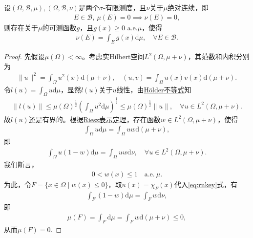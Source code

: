 \documentclass[../../main.tex]{subfiles}%
\begin{document}
\begin{theorem}\label{theorem:泛函分析--Radon-Nikodym定理}
设$(\Omega,\mathcal{B},\mu),(\Omega,\mathcal{B},\nu)$是两个$\sigma$-有限测度，且$\nu$关于$\mu$绝对连续，即
\begin{align*}
E\in\mathcal{B},\ \mu(E)=0\implies\nu(E)=0,
\end{align*}
则存在关于$\mu$的可测函数$g$，且$g(x)\geqslant 0$ a.e.$\mu$，使得
\begin{align*}
\nu(E)=\int_E g(x)\mathrm{d}\mu,\quad \forall E\in\mathcal{B}.
\end{align*}
\end{theorem}
\begin{proof}

先假设$\mu(\Omega)<\infty$。考虑实Hilbert空间$L^2(\Omega,\mu+\nu)$，其范数和内积分别为
\begin{align*}
\|u\|^2=\int_\Omega u^2(x)\mathrm{d}(\mu+\nu),\quad (u,v)=\int_\Omega u(x)v(x)\mathrm{d}(\mu+\nu).
\end{align*}
令$l(u)=\int_\Omega u\mathrm{d}\mu$，显然$l(u)$关于$u$线性，由\hyperref[Real-Analysis-theorem:实变函数--Hölder不等式]{Hölder不等式}知
\begin{align*}
\|l(u)\|\leqslant\mu(\Omega)^{\frac{1}{2}}\left(\int_\Omega u^2\mathrm{d}\mu\right)^{\frac{1}{2}}
\leqslant\mu(\Omega)^{\frac{1}{2}}\|u\|,\quad \forall u\in L^2(\Omega,\mu+\nu).
\end{align*}
故$l(u)$还是有界的。根据\hyperref[theorem:Riesz表示定理(Hilbert空间)]{Riesz表示定理}，存在函数$w\in L^2(\Omega,\mu+\nu)$，使得
\begin{align*}
\int_\Omega u\mathrm{d}\mu=\int_\Omega uw\mathrm{d}(\mu+\nu),
\end{align*}
即
\begin{align}
\int_\Omega u(1-w)\mathrm{d}\mu=\int_\Omega uw\mathrm{d}\nu,\quad \forall u\in L^2(\Omega,\mu+\nu).
\label{eq:rnkey}
\end{align}
我们断言，
\begin{align*}
0<w(x)\leqslant 1\quad \text{a.e.}\ \mu.
\end{align*}
为此，令$F=\{x\in\Omega\mid w(x)\leqslant 0\}$，取$u(x)=\chi_F(x)$代入\eqref{eq:rnkey}式，有
\begin{align*}
\int_F (1-w)\mathrm{d}\mu=\int_F w\mathrm{d}\nu,
\end{align*}
即
\begin{align*}
\mu(F)=\int_F \mathrm{d}\mu=\int_F w\mathrm{d}(\mu+\nu)\leqslant 0,
\end{align*}
从而$\mu(F)=0$.


\end{proof}
\end{document}
